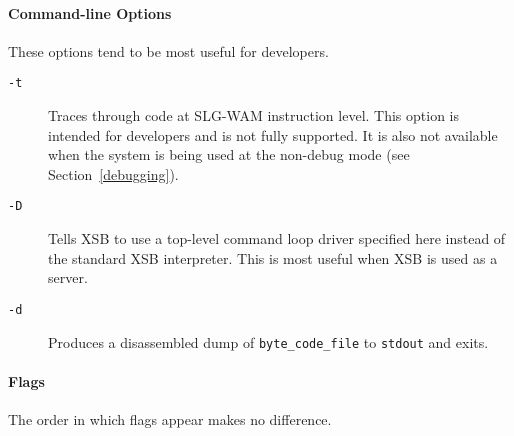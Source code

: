 \paragraph*{Command-line Options}  These options tend to be most useful for developers.

\begin{description}
\item[{\tt -t}] Traces through code at SLG-WAM instruction level.
  This option is intended for developers and is not fully supported.
  It is also not available when the system is being used at the
  non-debug mode (see Section~\ref{debugging}).
\item[{\tt -D}] Tells XSB to use a top-level command loop driver specified
  here instead of the standard XSB interpreter. This is most useful when
 XSB is used as a server.
\item[{\tt -d}] Produces a disassembled dump of {\tt byte\_code\_file} to 
    {\tt stdout} and exits.
\end{description}

\paragraph*{Flags}
The order in which flags appear makes no difference.

